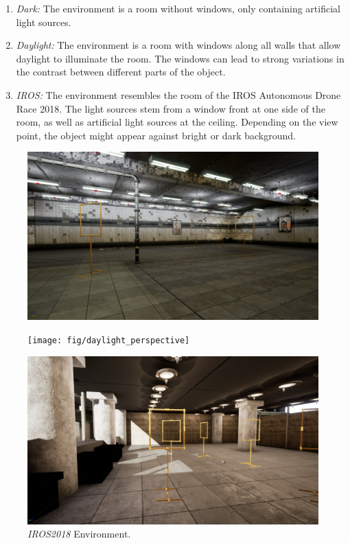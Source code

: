 \begin{enumerate}
	\item \textit{Dark:} The environment is a room without windows, only containing artificial light sources. 
	\item \textit{Daylight:} The environment is a room with windows along all walls that allow daylight to illuminate the room. The windows can lead to strong variations in the contrast between different parts of the object.
	\item \textit{IROS:} The environment resembles the room of the \ac{IROS} Autonomous Drone Race 2018. The light sources stem from a window front at one side of the room, as well as artificial light sources at the ceiling. Depending on the view point, the object might appear against bright or dark background.
\end{enumerate}

\begin{figure}[hbtp]
	\centering
	\begin{minipage}{0.3\textwidth}
		\includegraphics[width=\textwidth]{fig/basement_perspective}
	\end{minipage}
	\begin{minipage}{0.3\textwidth}
		\texttt{[image: fig/daylight\_perspective]}
	\end{minipage}
	\begin{minipage}{0.3\textwidth}
		\includegraphics[width=\textwidth]{fig/iros_perspective}
	\end{minipage}
	\caption{\textit{IROS2018} Environment.}
	\label{fig:environments}
\end{figure}



